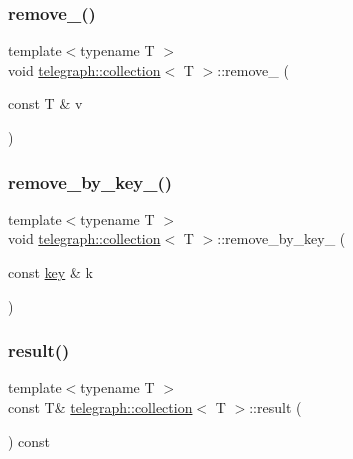 \mbox{\label{classtelegraph_1_1collection_ab736aff469340ac47c12c6b84ac9fd4d}} 
\subsubsection{\texorpdfstring{remove\+\_\+()}{remove\_()}}
{\footnotesize\ttfamily template$<$typename T $>$ \\
void \hyperlink{classtelegraph_1_1collection}{telegraph\+::collection}$<$ T $>$\+::remove\+\_\+ (\begin{DoxyParamCaption}\item[{const T \&}]{v }\end{DoxyParamCaption})\hspace{0.3cm}{\ttfamily [inline]}}

\mbox{\label{classtelegraph_1_1collection_a0e9199b87fb87d2602fc6e4cc33835c7}} 
\subsubsection{\texorpdfstring{remove\+\_\+by\+\_\+key\+\_\+()}{remove\_by\_key\_()}}
{\footnotesize\ttfamily template$<$typename T $>$ \\
void \hyperlink{classtelegraph_1_1collection}{telegraph\+::collection}$<$ T $>$\+::remove\+\_\+by\+\_\+key\+\_\+ (\begin{DoxyParamCaption}\item[{const \hyperlink{classtelegraph_1_1collection_a7d1c05b1bdcbe95a3127122969e14173}{key} \&}]{k }\end{DoxyParamCaption})\hspace{0.3cm}{\ttfamily [inline]}}

\mbox{\label{classtelegraph_1_1collection_ac3c0fd37e9000e9de5ba9c3aeee330c1}} 
\subsubsection{\texorpdfstring{result()}{result()}}
{\footnotesize\ttfamily template$<$typename T $>$ \\
const T\& \hyperlink{classtelegraph_1_1collection}{telegraph\+::collection}$<$ T $>$\+::result (\begin{DoxyParamCaption}{ }\end{DoxyParamCaption}) const\hspace{0.3cm}{\ttfamily [inline]}}

